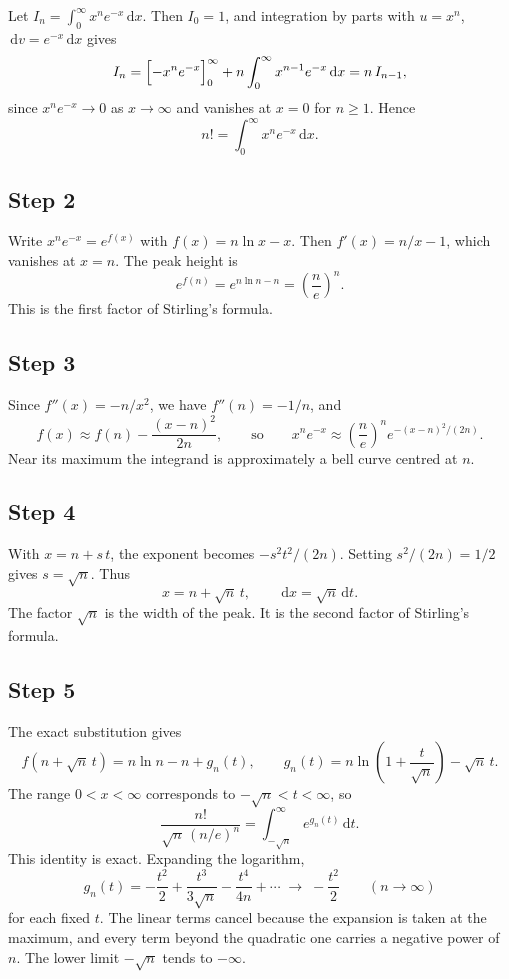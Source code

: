\documentclass{workbook}
\theoremstyle{step}
\newcommand{\dd}{\,\mathrm{d}}
\begin{document}
Let $I_n = \int_0^\infty x^n e^{-x}\dd x$. Then $I_0 = 1$, and integration by
parts with $u = x^n$, $\dd v = e^{-x}\dd x$ gives
\[
  I_n = \Bigl[-x^n e^{-x}\Bigr]_0^\infty + n\int_0^\infty x^{n-1}e^{-x}\dd x
      = n\,I_{n-1},
\]
since $x^n e^{-x}\to 0$ as $x\to\infty$ and vanishes at $x=0$ for $n\ge 1$.
Hence
\[
  n! = \int_0^\infty x^n e^{-x}\dd x .
\]

\subsection*{Step 2}

Write $x^n e^{-x} = e^{f(x)}$ with $f(x) = n\ln x - x$. Then
$f'(x) = n/x - 1$, which vanishes at $x = n$. The peak height is
\[
  e^{f(n)} = e^{n\ln n - n} = \left(\frac{n}{e}\right)^{n}.
\]
This is the first factor of Stirling's formula.

\subsection*{Step 3}

Since $f''(x) = -n/x^2$, we have $f''(n) = -1/n$, and
\[
  f(x) \approx f(n) - \frac{(x-n)^2}{2n},
  \qquad\text{so}\qquad
  x^n e^{-x} \approx \left(\frac{n}{e}\right)^{n} e^{-(x-n)^2/(2n)} .
\]
Near its maximum the integrand is approximately a bell curve centred at $n$.

\subsection*{Step 4}

With $x = n + s\,t$, the exponent becomes $-s^2 t^2/(2n)$. Setting
$s^2/(2n) = 1/2$ gives $s = \sqrt{n}$. Thus
\[
  x = n + \sqrt{n}\,t, \qquad \dd x = \sqrt{n}\dd t .
\]
The factor $\sqrt{n}$ is the width of the peak. It is the second factor of
Stirling's formula.

\subsection*{Step 5}

The exact substitution gives
\[
  f(n + \sqrt{n}\,t) = n\ln n - n + g_n(t),
  \qquad
  g_n(t) = n\ln\!\left(1 + \frac{t}{\sqrt{n}}\right) - \sqrt{n}\,t .
\]
The range $0 < x < \infty$ corresponds to $-\sqrt{n} < t < \infty$, so
\[
  \frac{n!}{\sqrt{n}\,(n/e)^n} = \int_{-\sqrt{n}}^{\infty} e^{g_n(t)}\dd t .
\]
This identity is exact. Expanding the logarithm,
\[
  g_n(t) = -\frac{t^2}{2} + \frac{t^3}{3\sqrt{n}} - \frac{t^4}{4n} + \cdots
  \;\longrightarrow\; -\frac{t^2}{2}
  \qquad (n\to\infty)
\]
for each fixed $t$. The linear terms cancel because the expansion is taken at
the maximum, and every term beyond the quadratic one carries a negative power
of $n$. The lower limit $-\sqrt{n}$ tends to $-\infty$.
\end{document}
